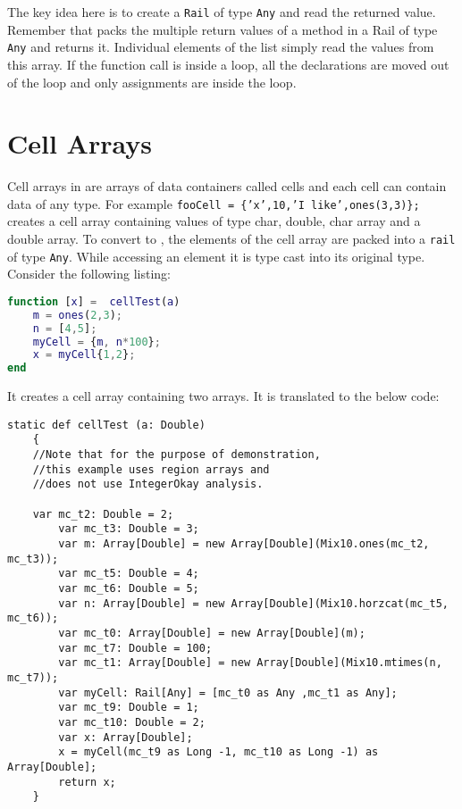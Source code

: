 The key idea here is to create a \texttt{Rail} of type \verb|Any| and read the
returned value. Remember that \mixten packs the multiple return values
of a method in a Rail of type \verb|Any| and returns it.  Individual
elements of the list simply read the values from this array. If the
function call is inside a loop, all the declarations are moved out of
the loop and only assignments are inside the loop. 

\section{Cell Arrays}

Cell arrays in \matlab are arrays of data containers called cells and
each cell can contain data of any type. For example \texttt{fooCell =
\{'x',10,'I like',ones(3,3)\};} creates a cell array containing values
of type char, double, char array and a double array. To convert to
\xten, the elements of the cell array are packed into a \texttt{rail} of
type \verb|Any|. While accessing an element it is type cast into its
original type.  Consider the following \matlab listing:
  
\begin{lstlisting}[language=Matlab,numbers=none]
function [x] =  cellTest(a)
	m = ones(2,3);
	n = [4,5];
	myCell = {m, n*100};
	x = myCell{1,2};
end
\end{lstlisting}

It creates a cell array containing two arrays. It is translated to the below
\xten code:

\begin{lstlisting}[language=X10,numbers=none]
static def cellTest (a: Double)
	{ 
    //Note that for the purpose of demonstration,
    //this example uses region arrays and
    //does not use IntegerOkay analysis.
		
    var mc_t2: Double = 2;
		var mc_t3: Double = 3;
		var m: Array[Double] = new Array[Double](Mix10.ones(mc_t2, mc_t3));
		var mc_t5: Double = 4;
		var mc_t6: Double = 5;
		var n: Array[Double] = new Array[Double](Mix10.horzcat(mc_t5, mc_t6));
		var mc_t0: Array[Double] = new Array[Double](m);
		var mc_t7: Double = 100;
		var mc_t1: Array[Double] = new Array[Double](Mix10.mtimes(n, mc_t7));
		var myCell: Rail[Any] = [mc_t0 as Any ,mc_t1 as Any];
		var mc_t9: Double = 1;
		var mc_t10: Double = 2;
		var x: Array[Double];
		x = myCell(mc_t9 as Long -1, mc_t10 as Long -1) as Array[Double];
		return x;
	}
\end{lstlisting}
